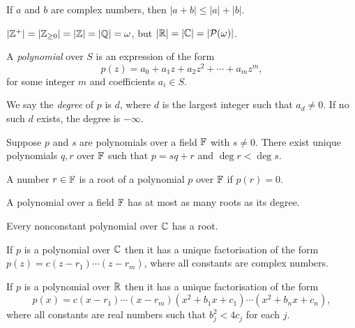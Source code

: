   \begin{prop}
    If $a$ and $b$ are complex numbers, then $|a+b|\le|a|+|b|$.
  \end{prop}
  \begin{thm}
    $|\mathbb{Z}^+|=|\mathbb{Z}_{\ge 0}|=|\mathbb{Z}|=|\mathbb{Q}|=\omega$, but $|\mathbb{R}|=|\mathbb{C}|=|\mathcal
    P(\omega)|$.
  \end{thm}
  \begin{defn}
    A \emph{polynomial} over $S$ is an expression of the form
    \[p(z)=a_0+a_1z+a_2 z^2+\cdots+a_m z^m,\]
    for some integer $m$ and coefficients $a_i\in S$.

    We say the \emph{degree} of $p$ is $d$, where $d$ is the largest integer
    such that $a_d\ne 0$. If no such $d$ exists, the degree is $-\infty$.
  \end{defn}
  \begin{prop}
    Suppose $p$ and $s$ are polynomials over a field $\mathbb{F}$
    with $s\ne 0$. There exist unique
    polynomials $q,r$ over $\mathbb{F}$ such that $p=sq+r$ and $\deg r<\deg s$.
  \end{prop}
  \begin{defn}
    A number $r\in\mathbb{F}$ is a root of a polynomial $p$ over $\mathbb{F}$ if $p(r)=0$.
  \end{defn}
  \begin{prop}
    A polynomial over a field $\mathbb{F}$ has at most as many roots as its degree.
  \end{prop}
  \begin{thm}
    Every nonconstant polynomial over $\mathbb{C}$ has a root.
  \end{thm}
  \begin{prop}
    If $p$ is a polynomial over $\mathbb{C}$ then it has a unique factorisation of the
    form $p(z)=c(z-r_1)\cdots(z-r_m)$, where all constants are complex numbers.
  \end{prop}
  \begin{prop}
    If $p$ is a polynomial over $\mathbb{R}$ then it has a unique factorisation of the
    form
    \[p(x)=c(x-r_1)\cdots(x-r_m)(x^2+b_1x+c_1)\cdots(x^2+b_n x+c_n),\]
    where all constants are real numbers such that $b_j^2<4c_j$ for each $j$.
  \end{prop}
